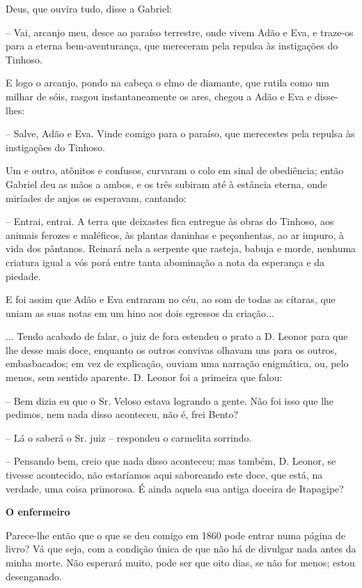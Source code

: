Deus, que ouvira tudo, disse a Gabriel:

-- Vai, arcanjo meu, desce ao paraíso terrestre, onde vivem Adão e Eva,
e traze-os para a eterna bem-aventurança, que mereceram pela repulsa às
instigações do Tinhoso.

E logo o arcanjo, pondo na cabeça o elmo de diamante, que rutila como um
milhar de sóis, rasgou instantaneamente os ares, chegou a Adão e Eva e
disse-lhes:

-- Salve, Adão e Eva. Vinde comigo para o paraíso, que merecestes pela
repulsa às instigações do Tinhoso.

Um e outro, atônitos e confusos, curvaram o colo em sinal de obediência;
então Gabriel deu as mãos a ambos, e os três subiram até à estância
eterna, onde miríades de anjos os esperavam, cantando:

-- Entrai, entrai. A terra que deixastes fica entregue às obras do
Tinhoso, aos animais ferozes e maléficos, às plantas daninhas e
peçonhentas, ao ar impuro, à vida dos pântanos. Reinará nela a serpente
que rasteja, babuja e morde, nenhuma criatura igual a vós porá entre
tanta abominação a nota da esperança e da piedade.

E foi assim que Adão e Eva entraram no céu, ao som de todas as cítaras,
que uniam as suas notas em um hino aos dois egressos da criação...

... Tendo acabado de falar, o juiz de fora estendeu o prato a D. Leonor
para que lhe desse mais doce, enquanto os outros convivas olhavam uns
para os outros, embasbacados; em vez de explicação, ouviam uma narração
enigmática, ou, pelo menos, sem sentido aparente. D. Leonor foi a
primeira que falou:

-- Bem dizia eu que o Sr. Veloso estava logrando a gente. Não foi isso
que lhe pedimos, nem nada disso aconteceu, não é, frei Bento?

-- Lá o saberá o Sr. juiz -- respondeu o carmelita sorrindo.

-- Pensando bem, creio que nada disso aconteceu; mas também, D. Leonor,
se tivesse acontecido, não estaríamos aqui saboreando este doce, que
está, na verdade, uma coisa primorosa. É ainda aquela sua antiga doceira
de Itapagipe?

\textbf{O enfermeiro}

Parece-lhe então que o que se deu comigo em 1860 pode entrar numa página
de livro? Vá que seja, com a condição única de que não há de divulgar
nada antes da minha morte. Não esperará muito, pode ser que oito dias,
se não for menos; estou desenganado.

